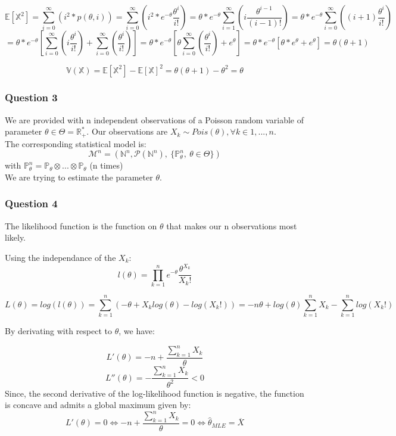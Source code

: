 \documentclass[]{article}
\begin{document}
\[
\mathbb{E}[\mathbb{X}^2] = \sum_{i=0}^{\infty} (i^2 * p(\theta, i)) = \sum_{i=0}^{\infty} (i^2*e^{-\theta} \frac{\theta^{i}}{i!}) = \theta * e^{-\theta}\sum_{i=1}^{\infty} (i\frac{\theta^{i-1}}{(i-1)!}) = \theta * e^{-\theta}\sum_{i=0}^{\infty} ((i+1)\frac{\theta^{i}}{i!})
\] \[
= \theta * e^{-\theta}[\sum_{i=0}^{\infty} (i\frac{\theta^{i}}{i!}) + \sum_{i=0}^{\infty} (\frac{\theta^{i}}{i!})] = \theta * e^{-\theta}[\theta \sum_{i=0}^{\infty} (\frac{\theta^{i}}{i!}) + e^{\theta}] = \theta * e^{-\theta}[\theta * e^{\theta} + e^{\theta}] = \theta (\theta + 1)
\]

\[
\mathbb{V} (\mathbb{X}) = \mathbb{E}[\mathbb{X}^2] - \mathbb{E}[\mathbb{X}]^2 = \theta (\theta + 1) - \theta^2 = \theta
\]

\hypertarget{question-3}{%
\subsubsection{Question 3}\label{question-3}}

We are provided with n independent observations of a Poisson random
variable of parameter \(\theta \in \Theta = \mathbb{R_+^*}\). Our
observations are
\(X_k \sim Pois (\theta), \forall k \in {1, ..., n}\).\\
The corresponding statistical model is:
\[\mathcal{M}^n = (\mathbb{N}^n, \mathcal{P}(\mathbb{N}^n),\ \{\mathbb{P}^n _{\theta},\ \theta \in\Theta \})\]
with
\(\mathbb{P}^n _{\theta} = \mathbb{P} _{\theta} \otimes ... \otimes \mathbb{P} _{\theta}\)
(n times)\\
We are trying to estimate the parameter \(\theta\).

\hypertarget{question-4}{%
\subsubsection{Question 4}\label{question-4}}

The likelihood function is the function on \(\theta\) that makes our n
observations most likely.

Using the independance of the \(X_k\): \[
l(\theta) = \prod_{k=1}^{n} e^{-\theta} \frac{\theta^{X_{k}}}{X_{k}!}
\]

\[
L(\theta) = log(l(\theta)) = \sum_{k=1} ^{n}(- \theta + X_k log(\theta) - log(X_k!)) = - n \theta + log(\theta) \sum_{k=1}^{n}X_{k} - \sum_{k=1}^{n}log(X_{k}!)
\]

By derivating with respect to \(\theta\), we have:

\[
L'(\theta) = -n +\frac{\sum_{k=1}^{n}X_{k}}{\theta}
\] \[
L''(\theta) = - \frac{\sum_{k=1}^{n}X_{k}}{\theta^2} < 0
\] Since, the second derivative of the log-likelihood function is
negative, the function is concave and admits a global maximum given by:
\[
L'(\theta) = 0 \Leftrightarrow -n +\frac{\sum_{k=1}^{n}X_{k}}{\theta} = 0 \Leftrightarrow \hat\theta_{MLE} = \overline{X}
\]
\end{document}
